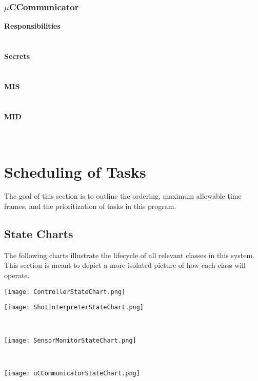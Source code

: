 \documentclass[titlepage]{article}
\begin{document}
\subsubsection{$\mu$CCommunicator}
\textbf{Responsibilities}\\
\\\\%
\textbf{Secrets}\\
\\\\%
\textbf{MIS}\\
\\\\%
\textbf{MID}\\
\\\\%
\newpage

\section{Scheduling of Tasks}
The goal of this section is to outline the ordering, maximum allowable time frames, and the prioritization of tasks in this program.
\subsection{State Charts}
The following charts illustrate the lifecycle of all relevant classes in this system. This section is meant to depict a more isolated picture of how each class will operate.\\[15mm]
\begin{center}
	\texttt{[image: ControllerStateChart.png]}
\label{fig:ControllerStateChart}
\end{center}
\newpage

\begin{center}
	\texttt{[image: ShotInterpreterStateChart.png]}
\label{fig:ShotInterpreterStateChart}
\end{center}
\begin{multicols}{2}
~\vfill
\begin{center}
	\texttt{[image: SensorMonitorStateChart.png]}
\label{fig:SensorMonitorStateChart}
\end{center}
~\vfill
\begin{center}
	\texttt{[image: uCCommunicatorStateChart.png]}
\label{fig:uCCommunicatorStateChart}
\end{center}
\end{multicols}
\newpage
\end{document}
